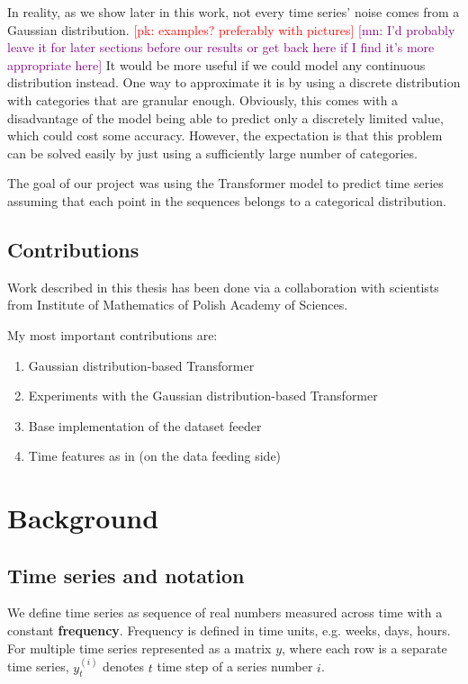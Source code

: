 \documentclass[en]{pracamgr}
\newcommand{\pk}[1]{\textcolor{red}{\small [pk: #1]}}
\newcommand{\mn}[1]{\textcolor{purple}{\small [mn: #1]}}
\begin{document}
In reality, as we show later in this work, not every time series' noise comes from a Gaussian distribution. \pk{examples? preferably with pictures} \mn{I'd probably leave it for later sections before our results or get back here if I find it's more appropriate here}
It would be more useful if we could model any continuous distribution instead. One way to approximate it is by using a discrete distribution with categories that are granular enough. Obviously, this comes with a disadvantage of the model being able to predict only a discretely limited value, which could cost some accuracy. However, the expectation is that this problem can be solved easily by just using a sufficiently large number of categories.

The goal of our project was using the Transformer model to predict time series assuming that each point in the sequences belongs to a categorical distribution.



\section*{Contributions}\label{r:contributions}

Work described in this thesis has been done via a collaboration with scientists from Institute of Mathematics of Polish Academy of Sciences.

My most important contributions are:
\begin{enumerate}
	\item Gaussian distribution-based Transformer
	\item Experiments with the Gaussian distribution-based Transformer
	\item Base implementation of the dataset feeder
	\item Time features as in \cite{enhancing} (on the data feeding side)
\end{enumerate}

\chapter{Background}\label{r:background}

\section{Time series and notation}

We define time series as sequence of real numbers measured across time with a constant \textbf{frequency}. Frequency is defined in time units, e.g. weeks, days, hours. For multiple time series represented as a matrix $y$, where each row is a separate time series, $y^{(i)}_t$ denotes $t$ time step of a series number $i$.
\end{document}
